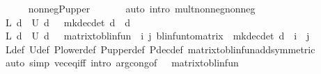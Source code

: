 \begin{isabellebody}
\ \ \ \ \isamarkupfalse%
\ nonneg{\isacharunderscore}{\kern0pt}P{\isacharunderscore}{\kern0pt}upper\ \isanewline
\ \ \ \ \isamarkupfalse%
\ {\isacharparenleft}{\kern0pt}auto\ intro{\isacharbang}{\kern0pt}{\isacharcolon}{\kern0pt}\ mult{\isacharunderscore}{\kern0pt}nonneg{\isacharunderscore}{\kern0pt}nonneg{\isacharparenright}{\kern0pt}\isanewline
{}\isamarkupfalse%
\isanewline
\ \ \isamarkupfalse%
\ {\isachardoublequoteopen}{\isasymP}\isactrlsub L\ d\ {\isacharplus}{\kern0pt}\ {\isasymP}\isactrlsub U\ d\ {\isacharequal}{\kern0pt}\ {\isasymP}\ {\isacharparenleft}{\kern0pt}mk{\isacharunderscore}{\kern0pt}dec{\isacharunderscore}{\kern0pt}det\ d{\isacharparenright}{\kern0pt}{\isachardoublequoteclose}\ \ d\isanewline
\ \ \isamarkupfalse%
\ {\isacharminus}{\kern0pt}\isanewline
\ \ \ \ \isamarkupfalse%
\ {\isachardoublequoteopen}{\isasymP}\isactrlsub L\ d\ {\isacharplus}{\kern0pt}\ {\isasymP}\isactrlsub U\ d\ \ {\isacharequal}{\kern0pt}\ matrix{\isacharunderscore}{\kern0pt}to{\isacharunderscore}{\kern0pt}blinfun\ {\isacharparenleft}{\kern0pt}{\isasymchi}\ i\ j{\isachardot}{\kern0pt}\ {\isacharparenleft}{\kern0pt}{\isacharparenleft}{\kern0pt}blinfun{\isacharunderscore}{\kern0pt}to{\isacharunderscore}{\kern0pt}matrix\ {\isacharparenleft}{\kern0pt}{\isasymP}\ {\isacharparenleft}{\kern0pt}mk{\isacharunderscore}{\kern0pt}dec{\isacharunderscore}{\kern0pt}det\ d{\isacharparenright}{\kern0pt}{\isacharparenright}{\kern0pt}{\isacharparenright}{\kern0pt}{\isacharparenright}{\kern0pt}\ {\isachardollar}{\kern0pt}\ i\ {\isachardollar}{\kern0pt}\ j{\isacharparenright}{\kern0pt}{\isachardoublequoteclose}\isanewline
\ \ \ \ \ \ \isamarkupfalse%
\ {\isasymP}\isactrlsub L{\isacharunderscore}{\kern0pt}def\ {\isasymP}\isactrlsub U{\isacharunderscore}{\kern0pt}def\ P{\isacharunderscore}{\kern0pt}lower{\isacharunderscore}{\kern0pt}def\ P{\isacharunderscore}{\kern0pt}upper{\isacharunderscore}{\kern0pt}def\ P{\isacharunderscore}{\kern0pt}dec{\isacharunderscore}{\kern0pt}def\ matrix{\isacharunderscore}{\kern0pt}to{\isacharunderscore}{\kern0pt}blinfun{\isacharunderscore}{\kern0pt}add{\isacharbrackleft}{\kern0pt}symmetric{\isacharbrackright}{\kern0pt}\isanewline
\ \ \ \ \ \ \isamarkupfalse%
\ {\isacharparenleft}{\kern0pt}auto\ simp{\isacharcolon}{\kern0pt}\ vec{\isacharunderscore}{\kern0pt}eq{\isacharunderscore}{\kern0pt}iff\ intro{\isacharbang}{\kern0pt}{\isacharcolon}{\kern0pt}\ arg{\isacharunderscore}{\kern0pt}cong{\isacharbrackleft}{\kern0pt}of\ {\isacharunderscore}{\kern0pt}\ {\isacharunderscore}{\kern0pt}\ matrix{\isacharunderscore}{\kern0pt}to{\isacharunderscore}{\kern0pt}blinfun{\isacharbrackright}{\kern0pt}{\isacharparenright}{\kern0pt}\isanewline

\end{isabellebody}
